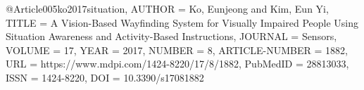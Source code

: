@Article{005ko2017situation,
AUTHOR = {Ko, Eunjeong and Kim, Eun Yi},
TITLE = {A Vision-Based Wayfinding System for Visually Impaired People Using Situation Awareness and Activity-Based Instructions},
JOURNAL = {Sensors},
VOLUME = {17},
YEAR = {2017},
NUMBER = {8},
ARTICLE-NUMBER = {1882},
URL = {https://www.mdpi.com/1424-8220/17/8/1882},
PubMedID = {28813033},
ISSN = {1424-8220},
DOI = {10.3390/s17081882}
}